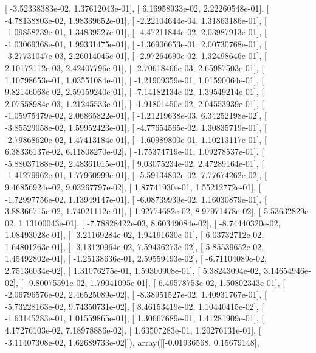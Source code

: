 \documentclass{article}
\begin{document}
       [ -3.52338383e-02,   1.37612043e-01],
       [  6.16958933e-02,   2.22260548e-01],
       [ -4.78138803e-02,   1.98339652e-01],
       [ -2.22104644e-04,   1.31863186e-01],
       [ -1.09858239e-01,   1.34839527e-01],
       [ -4.47211844e-02,   2.03987913e-01],
       [ -1.03069368e-01,   1.99331475e-01],
       [ -1.36906653e-01,   2.00730768e-01],
       [ -3.27731047e-03,   2.26014045e-01],
       [ -2.97264690e-02,   1.32498646e-01],
       [  2.10172112e-03,   2.42407796e-01],
       [ -2.70618466e-03,   2.65987503e-01],
       [  1.10798653e-01,   1.03551084e-01],
       [ -1.21909359e-01,   1.01590064e-01],
       [  9.82146068e-02,   2.59159240e-01],
       [ -7.14182134e-02,   1.39549214e-01],
       [  2.07558984e-03,   1.21245533e-01],
       [ -1.91801450e-02,   2.04553939e-01],
       [ -1.05975479e-02,   2.06865822e-01],
       [ -1.21219638e-03,   6.34252198e-02],
       [ -3.85529058e-02,   1.59952423e-01],
       [ -4.77654565e-02,   1.30835719e-01],
       [ -2.79868620e-02,   1.47413184e-01],
       [ -1.60989800e-01,   1.10213117e-01],
       [  6.38336137e-02,   6.11808270e-02],
       [ -1.75374719e-01,   1.09278537e-01],
       [ -5.88037188e-02,   2.48361015e-01],
       [  9.03075234e-02,   2.47289164e-01],
       [ -1.41279962e-01,   1.77960999e-01],
       [ -5.59134802e-02,   7.77674262e-02],
       [  9.46856924e-02,   9.03267797e-02],
       [  1.87741930e-01,   1.55212772e-01],
       [ -1.72997756e-02,   1.13949147e-01],
       [ -6.08739939e-02,   1.16030879e-01],
       [  3.88366715e-02,   1.74021112e-01],
       [  1.92774682e-02,   8.97971478e-02],
       [  5.53632829e-02,   1.13100043e-01],
       [ -7.78828422e-03,   8.60349084e-02],
       [ -8.74440320e-02,   1.08493028e-01],
       [ -3.21169284e-02,   1.94191630e-01],
       [  6.03732712e-02,   1.64801263e-01],
       [ -3.13120964e-02,   7.59436273e-02],
       [  5.85539652e-02,   1.45492802e-01],
       [ -1.25138636e-01,   2.59559493e-02],
       [ -6.71104089e-02,   2.75136034e-02],
       [  1.31076275e-01,   1.59300908e-01],
       [  5.38243094e-02,   3.14654946e-02],
       [ -9.80075591e-02,   1.79041095e-01],
       [  6.49578753e-02,   1.50802343e-01],
       [ -2.06796576e-02,   2.46525089e-02],
       [ -8.38951527e-02,   1.40931767e-01],
       [ -5.73228163e-02,   9.74350731e-02],
       [  8.46153419e-02,   1.10440415e-02],
       [ -1.63145283e-01,   1.01559865e-01],
       [  1.30667689e-01,   1.41281909e-01],
       [  4.17276103e-02,   7.18978886e-02],
       [  1.63507283e-01,   1.20276131e-01],
       [ -3.11407308e-02,   1.62689733e-02]]), array([[-0.01936568,  0.15679148],
\end{document}
